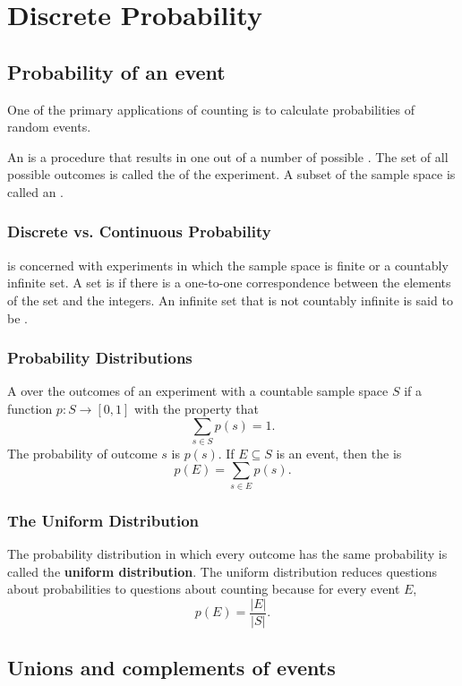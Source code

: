 \section{Discrete Probability}
\subsection{Probability of an event}
One of the primary applications of counting is to calculate probabilities of random events.

An  is a procedure that results in one out of a number of possible . The set of all possible outcomes is called the  of the experiment. A subset of the sample space is called an .

\subsubsection*{Discrete vs. Continuous Probability}
 is concerned with experiments in which the sample space is finite or a countably infinite set. A set is  if there is a one-to-one correspondence between the elements of the set and the integers. An infinite set that is not countably infinite is said to be .

\subsubsection*{Probability Distributions}
A  over the outcomes of an experiment with a countable sample space $S$ if a function $p: S \rightarrow [0,1]$ with the property that
\[
  \sum_{s \in S} p(s) = 1.
\]
The probability of outcome $s$ is $p(s)$. If $E \subseteq S$ is an event, then the  is
\[
  p(E) = \sum_{s \in E} p(s).
\]

\subsubsection*{The Uniform Distribution}
The probability distribution in which every outcome has the same probability is called the \textbf{uniform distribution}. The uniform distribution reduces questions about probabilities to questions about counting because for every event $E$,
\[
  p(E) = \frac{|E|}{|S|}.
\]

\subsection{Unions and complements of events}

